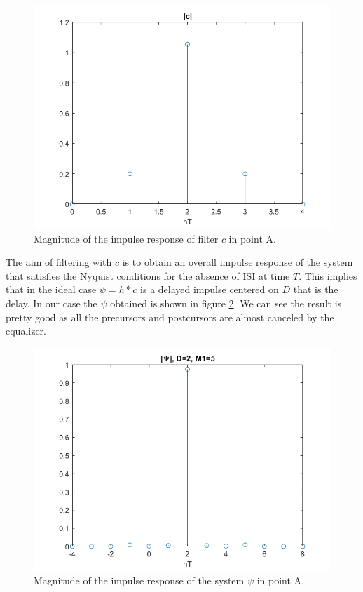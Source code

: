 \documentclass[a4paper,11.5pt]{article}
\begin{document}
\begin{figure}[ht]
	\begin{center}   
		\includegraphics[width=\textwidth]{figs/A_c.png} 
		\caption{Magnitude of the impulse response of filter $c$ in point A.}
		\label{fig:A_c}
	\end{center}
\end{figure}

The aim of filtering with $c$ is to obtain an overall impulse response of the system that satisfies the Nyquist conditions for the absence of ISI at time $T$. This implies that in the ideal case $\psi=h*c$ is a delayed impulse centered on $D$ that is the delay. In our case the $\psi$ obtained is shown in figure \ref{fig:A_psi}. We can see the result is pretty good as all the precursors and postcursors are almost canceled by the equalizer. 


\begin{figure}[ht]
	\begin{center}   
		\includegraphics[width=\textwidth]{figs/A_psi.png} 
		\caption{Magnitude of the impulse response of the system $\psi$ in point A.}
		\label{fig:A_psi}
	\end{center}
\end{figure}
\end{document}
